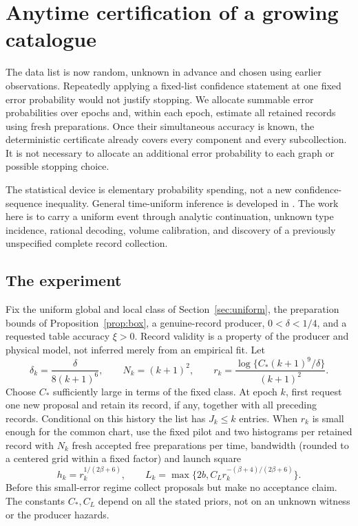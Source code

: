\section{Anytime certification of a growing catalogue}
\label{sec:sequential}
The data list is now random, unknown in advance and chosen using earlier
observations. Repeatedly applying a fixed-list confidence statement at
one fixed error probability would not justify stopping. We allocate
summable error probabilities over epochs and, within each epoch, estimate
all retained records using fresh preparations. Once their simultaneous
accuracy is known, the deterministic certificate already covers every
component and every subcollection. It is not necessary to allocate an
additional error probability to each graph or possible stopping choice.

The statistical device is elementary probability spending, not a new
confidence-sequence inequality. General time-uniform inference is developed
in \cite{HRMS}. The work here is to carry a uniform event through analytic
continuation, unknown type incidence, rational decoding, volume calibration,
and discovery of a previously unspecified complete record collection.

\subsection{The experiment}
Fix the uniform global and local class of Section~\ref{sec:uniform}, the
preparation bounds of Proposition~\ref{prop:box}, a genuine-record producer,
$0<\delta<1/4$, and a requested table accuracy $\xi>0$. Record validity
is a property of the producer and physical model, not inferred merely
from an empirical fit. Let
\begin{equation}\label{eq:epoch-schedule}
 \delta_k=\frac{\delta}{8(k+1)^6},\qquad
 N_k=(k+1)^2,\qquad
 r_k=\frac{\log\{C_*(k+1)^9/\delta\}}{(k+1)^2}.
\end{equation}
Choose $C_*$ sufficiently large in terms of the fixed class. At epoch
$k$, first request one new proposal and retain its record, if any, together
with all preceding records. Conditional on this history the list has
$J_k\le k$ entries. When $r_k$ is small enough for the common chart,
use the fixed pilot and two histograms per retained record with $N_k$
fresh accepted free preparations per time, bandwidth (rounded to a centered grid within a fixed factor) and launch square
\begin{equation}\label{eq:epoch-geometry}
 h_k=r_k^{1/(2\beta+6)},\qquad
 L_k=\max\{2b,C_Lr_k^{-(\beta+4)/(2\beta+6)}\}.
\end{equation}
Before this small-error regime collect proposals but make no acceptance
claim. The constants $C_*,C_L$ depend on all the stated priors, not on an
unknown witness or the producer hazards.

